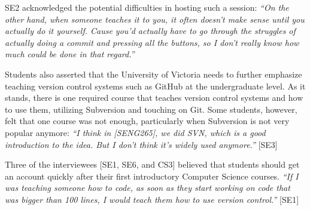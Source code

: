 
SE2 acknowledged the potential difficulties in hosting such a session: \textit{``On the other hand, when someone teaches it to you, it often doesn't make sense until you actually do it yourself. Cause you'd actually have to go through the struggles of actually doing a commit and pressing all the buttons, so I don't really know how much could be done in that regard.''}

Students also asserted that the University of Victoria needs to further emphasize teaching version control systems such as GitHub at the undergraduate level. As it stands, there is one required course that teaches version control systems and how to use them, utilizing Subversion and touching on Git. Some students, however, felt that one course was not enough, particularly when Subversion is not very popular anymore: \textit{``I think in [SENG265], we did SVN, which is a good introduction to the idea. But I don't think it's widely used anymore.''} [SE3]



Three of the interviewees [SE1, SE6, and CS3] believed that students should get an account quickly after their first introductory Computer Science courses. \textit{``If I was teaching someone how to code, as soon as they start working on code that was bigger than 100 lines, I would teach them how to use version control.''} [SE1]

